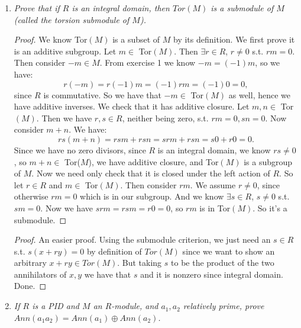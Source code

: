 \documentclass[12pt]{amsbook}
\theoremstyle{plain}
\numberwithin{section}{chapter}
\numberwithin{equation}{chapter}
\theoremstyle{definition}
\theoremstyle{remark}
\begin{document}
\begin{enumerate}[label=\arabic*.]
\item \textit{Prove that if $R$ is an integral domain, then $Tor(M)$ is a submodule of $M$ (called the torsion submodule of $M$). }
\begin{proof}
We know Tor$(M)$ is a subset of $M$ by its definition. We first prove it is an additive subgroup. Let $m \in $ Tor$(M)$. Then $\exists r \in R$, $r \neq 0$ s.t. $rm = 0$. Then consider $-m \in M$. From exercise 1 we know 
$
-m = (-1)m$, so we have:
$$
r(-m) = r(-1)m = (-1)rm = (-1)0 = 0,
$$
 since $R$ is commutative. So we have that $-m \in $ Tor$(M)$ as well, hence we have additive inverses. We check that it has additive closure. Let $m,n \in $ Tor$(M)$. Then we have $r,s \in R$, neither being zero, s.t. $rm = 0, sn = 0$. Now consider $m + n$. We have:
$$
rs(m + n) = rsm + rsn = srm + rsn = s0 + r0 = 0.
$$
Since we have no zero divisors, since $R$ is an integral domain, we know $rs \neq 0$, so $m  +n \in $ Tor($M$), we have additive closure, and Tor$(M)$ is a subgroup of $M$. Now we need only check that it is closed under the left action of $R$. So let $r \in R$ and $m \in $ Tor$(M)$. Then consider $rm$. We assume $r \neq 0$, since otherwise $rm = 0$ which is in our subgroup. And we know $\exists s \in R$, $s \neq 0$ s.t. $sm = 0$. Now we have $srm = rsm = r0 = 0$, so $rm$ is in Tor$(M)$. So it's a submodule. 
\end{proof}

\begin{proof}
An easier proof. Using the submodule criterion, we just need an $s \in R$ s.t. $s(x + ry) = 0$ by definition of $Tor(M)$ since we want to show an arbitrary $x  +ry \in Tor(M)$. But taking $s$ to be the product of the two annihilators of $x,y$ we have that $s$ and it is nonzero since integral domain. Done. 
\end{proof}

\item \textit{If $R$ is a PID and $M$ an $R$-module, and $a_1,a_2$ relatively prime, prove $Ann(a_1a_2) = Ann(a_1) \oplus Ann(a_2)$. }


\end{enumerate}
\end{document}
